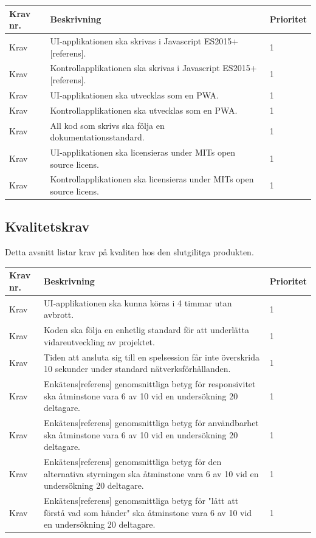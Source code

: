 \documentclass[10pt]{article}
\newcounter{indexcounter}
\newcommand{\Krav}[2]{
	\stepcounter{indexcounter}
	Krav \arabic{indexcounter} & #1 & #2 \\ \hline
}
\begin{document}
	\begin{tabular}{| p{2cm} | p{8cm} | p{2cm}|}
		\hline
		\textbf{Krav nr.} & \textbf{Beskrivning} & \textbf{Prioritet} \\ \hline
		
		\Krav{UI-applikationen ska skrivas i Javascript ES2015+[referens].}{1}
		\Krav{Kontrollapplikationen ska skrivas i Javascript ES2015+[referens].}{1}
		\Krav{UI-applikationen ska utvecklas som en PWA.}{1}
		\Krav{Kontrollapplikationen ska utvecklas som en PWA.}{1}
		\Krav{All kod som skrivs ska följa en dokumentationsstandard.}{1}
		\Krav{UI-applikationen ska licensieras under MITs open source licens.}{1}
		\Krav{Kontrollapplikationen ska licensieras under MITs open source licens.}{1}
		
	\end{tabular}

	\subsection{Kvalitetskrav}
	Detta avsnitt listar krav på kvaliten hos den slutgilitga produkten.
	
		\begin{tabular}{|p{2cm}|p{8cm}|p{2cm}|}
		\hline
		\textbf{Krav nr.} & \textbf{Beskrivning} & \textbf{Prioritet} \\ \hline
		
		\Krav{UI-applikationen ska kunna köras i 4 timmar utan avbrott.}{1}
		\Krav{Koden ska följa en enhetlig standard för att underlätta vidareutveckling av projektet.}{1}
		\Krav{Tiden att ansluta sig till en spelsession får inte överskrida 10 sekunder under standard nätverksförhållanden.}{1}
		\Krav{Enkätens[referens] genomsnittliga betyg för responsivitet ska åtminstone vara 6 av 10 vid en undersökning 20 deltagare.}{1}
		\Krav{Enkätens[referens] genomsnittliga betyg för användbarhet ska åtminstone vara 6 av 10 vid en undersökning 20 deltagare.}{1}
		\Krav{Enkätens[referens] genomsnittliga betyg för den alternativa styrningen ska åtminstone vara 6 av 10 vid en undersökning 20 deltagare.}{1}
		\Krav{Enkätens[referens] genomsnittliga betyg för "lått att förstå vad som händer" ska åtminstone vara 6 av 10 vid en undersökning 20 deltagare.}{1}
				
	\end{tabular}
	
\pagebreak

\printbibliography
{}
\end{document}

